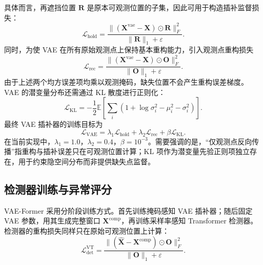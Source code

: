 \documentclass[bachelor, vlined]{DissertUESTC}
\begin{document}
    具体而言，再遮挡位置 $\mathbf{R}$ 是原本可观测位置的子集，因此可用于构造插补监督损失：
    \begin{equation}
        \mathcal{L}_{\mathrm{hold}}
        =
        \frac{\|(\mathbf{X}^{\mathrm{vae}}-\mathbf{X}) \odot \mathbf{R}\|_F^2}{\|\mathbf{R}\|_1 + \varepsilon}.
    \end{equation}
    同时，为使 VAE 在所有原始观测点上保持基本重构能力，引入观测点重构损失
    \begin{equation}
        \mathcal{L}_{\mathrm{rec}}
        =
        \frac{\|(\mathbf{X}^{\mathrm{vae}}-\mathbf{X}) \odot \mathbf{O}\|_F^2}{\|\mathbf{O}\|_1 + \varepsilon}.
    \end{equation}
    由于上述两个均方误差项均乘以观测掩码，缺失位置不会产生重构误差梯度。VAE 的潜变量分布还需通过 KL 散度进行正则化：
    \begin{equation}
        \mathcal{L}_{\mathrm{KL}}
        =
        -\frac{1}{2}
        \mathbb{E}
        \left[
            \sum_i
            \left(
                1+\log\sigma_i^2-\mu_i^2-\sigma_i^2
            \right)
        \right].
    \end{equation}
    最终 VAE 插补器的训练目标为
    \begin{equation}
        \mathcal{L}_{\mathrm{VAE}}
        =
        \lambda_1\mathcal{L}_{\mathrm{hold}}
        +
        \lambda_2\mathcal{L}_{\mathrm{rec}}
        +
        \beta\mathcal{L}_{\mathrm{KL}}.
    \end{equation}
    在当前实现中，$\lambda_1=1.0$，$\lambda_2=0.4$，$\beta=10^{-3}$。需要强调的是，“仅观测点反向传播”指重构与插补误差只在可观测位置计算；KL 项作为潜变量先验正则项独立存在，用于约束隐空间分布而非提供缺失点监督。

    \subsection{检测器训练与异常评分}

    VAE-Former 采用分阶段训练方式。首先训练掩码感知 VAE 插补器；随后固定 VAE 参数，用其生成完整窗口 $\mathbf{X}^{\mathrm{comp}}$，再训练采样率感知 Transformer 检测器。检测器的重构损失同样只在原始可观测位置上计算：
    \begin{equation}
        \mathcal{L}_{\mathrm{det}}^{\mathrm{VT}}
        =
        \frac{\|(\hat{\mathbf{X}}-\mathbf{X}^{\mathrm{comp}}) \odot \mathbf{O}\|_F^2}{\|\mathbf{O}\|_1 + \varepsilon}.
    \end{equation}
\end{document}
